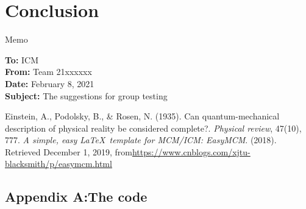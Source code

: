 \documentclass[12pt]{article}  %
\begin{document}
\section{Conclusion}











\begin{letter}{Memo}
\begin{flushleft}  %
\textbf{To:}  ICM\\
\textbf{From:} Team 21xxxxxx\\
\textbf{Date:} February 8, 2021\\
\textbf{Subject:} The suggestions for group testing
\end{flushleft}

\end{letter}


\begin{thebibliography}{99}
 Einstein, A., Podolsky, B., \& Rosen, N. (1935). Can quantum-mechanical description of physical reality be considered complete?. \emph{Physical review}, 47(10), 777.
 \emph{A simple, easy \LaTeX\ template for MCM/ICM: EasyMCM}. (2018). Retrieved December 1, 2019, from\url{https://www.cnblogs.com/xjtu-blacksmith/p/easymcm.html}

\end{thebibliography}


\begin{subappendices}  %

\section{Appendix A:The code}
\begin{lstlisting}[language=Python]
\end{lstlisting}

\end{subappendices}
\end{document}
